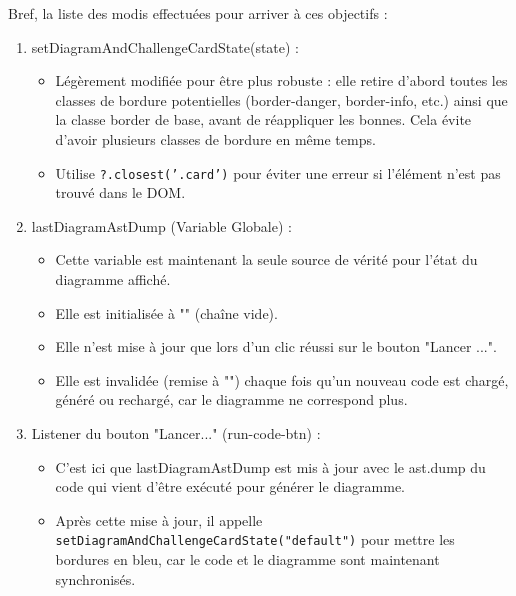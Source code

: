 \documentclass[11pt,a4paper]{article}
\begin{document}
Bref, la liste des modis effectuées pour arriver à ces objectifs :\\
\begin{enumerate}

    \item setDiagramAndChallengeCardState(state) :
    \begin{itemize}
        \item Légèrement modifiée pour être plus robuste : elle retire d'abord toutes les classes de bordure potentielles (border-danger, border-info, etc.) ainsi que la classe border de base, avant de réappliquer les bonnes. Cela évite d'avoir plusieurs classes de bordure en même temps.
        \item Utilise \texttt{?.closest('.card')} pour éviter une erreur si l'élément n'est pas trouvé dans le DOM.
    \end{itemize}
    
    \item lastDiagramAstDump (Variable Globale) :
    \begin{itemize}
        \item Cette variable est maintenant la seule source de vérité pour l'état du diagramme affiché.
        \item Elle est initialisée à "" (chaîne vide).
        \item Elle n'est mise à jour que lors d'un clic réussi sur le bouton "Lancer ...".
        \item Elle est invalidée (remise à "") chaque fois qu'un nouveau code est chargé, généré ou rechargé, car le diagramme ne correspond plus.
    \end{itemize}

    \item Listener du bouton "Lancer..." (run-code-btn) :
    \begin{itemize}
        \item C'est ici que lastDiagramAstDump est mis à jour avec le ast.dump du code qui vient d'être exécuté pour générer le diagramme.
        \item Après cette mise à jour, il appelle \texttt{setDiagramAndChallengeCardState("default")} pour mettre les bordures en bleu, car le code et le diagramme sont maintenant synchronisés.
    \end{itemize}


\end{enumerate}
\end{document}
